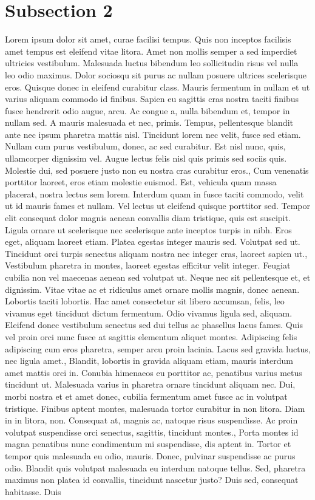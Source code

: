 \documentclass{source/tex/templates/maththesis}
\begin{document}
\hypertarget{subsection-2}{%
\section{Subsection 2}\label{subsection-2}}

Lorem ipsum dolor sit amet, curae facilisi tempus. Quis non inceptos facilisis amet tempus est eleifend vitae litora. Amet non mollis semper a sed imperdiet ultricies vestibulum. Malesuada luctus bibendum leo sollicitudin risus vel nulla leo odio maximus. Dolor sociosqu sit purus ac nullam posuere ultrices scelerisque eros. Quisque donec in eleifend curabitur class. Mauris fermentum in nullam et ut varius aliquam commodo id finibus. Sapien eu sagittis cras nostra taciti finibus fusce hendrerit odio augue, arcu. Ac congue a, nulla bibendum et, tempor in nullam sed. A mauris malesuada et nec, primis. Tempus, pellentesque blandit ante nec ipsum pharetra mattis nisl. Tincidunt lorem nec velit, fusce sed etiam. Nullam cum purus vestibulum, donec, ac sed curabitur. Est nisl nunc, quis, ullamcorper dignissim vel. Augue lectus felis nisl quis primis sed sociis quis. Molestie dui, sed posuere justo non eu nostra cras curabitur eros., Cum venenatis porttitor laoreet, eros etiam molestie euismod. Est, vehicula quam massa placerat, nostra lectus sem lorem. Interdum quam in fusce taciti commodo, velit ut id mauris fames et nullam. Vel lectus ut eleifend quisque porttitor sed. Tempor elit consequat dolor magnis aenean convallis diam tristique, quis est suscipit. Ligula ornare ut scelerisque nec scelerisque ante inceptos turpis in nibh. Eros eget, aliquam laoreet etiam. Platea egestas integer mauris sed. Volutpat sed ut. Tincidunt orci turpis senectus aliquam nostra nec integer cras, laoreet sapien ut., Vestibulum pharetra in montes, laoreet egestas efficitur velit integer. Feugiat cubilia non vel maecenas aenean sed volutpat ut. Neque nec sit pellentesque et, et dignissim. Vitae vitae ac et ridiculus amet ornare mollis magnis, donec aenean. Lobortis taciti lobortis. Hac amet consectetur sit libero accumsan, felis, leo vivamus eget tincidunt dictum fermentum. Odio vivamus ligula sed, aliquam. Eleifend donec vestibulum senectus sed dui tellus ac phasellus lacus fames. Quis vel proin orci nunc fusce at sagittis elementum aliquet montes. Adipiscing felis adipiscing cum eros pharetra, semper arcu proin lacinia. Lacus sed gravida luctus, nec ligula amet., Blandit, lobortis in gravida aliquam etiam, mauris interdum amet mattis orci in. Conubia himenaeos eu porttitor ac, penatibus varius metus tincidunt ut. Malesuada varius in pharetra ornare tincidunt aliquam nec. Dui, morbi nostra et et amet donec, cubilia fermentum amet fusce ac in volutpat tristique. Finibus aptent montes, malesuada tortor curabitur in non litora. Diam in in litora, non. Consequat at, magnis ac, natoque risus suspendisse. Ac proin volutpat suspendisse orci senectus, sagittis, tincidunt montes., Porta montes id magna penatibus nunc condimentum mi suspendisse, dis aptent in. Tortor et tempor quis malesuada eu odio, mauris. Donec, pulvinar suspendisse ac purus odio. Blandit quis volutpat malesuada eu interdum natoque tellus. Sed, pharetra maximus non platea id convallis, tincidunt nascetur justo? Duis sed, consequat habitasse. Duis 
\end{document}
